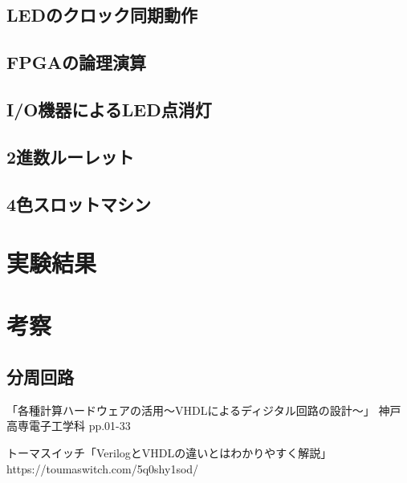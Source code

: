\documentclass{ltjsarticle}
\begin{document}
	\subsection{LEDのクロック同期動作}
	\subsection{FPGAの論理演算}
	\subsection{I/O機器によるLED点消灯}
	\subsection{2進数ルーレット}
	\subsection{4色スロットマシン}
\section{実験結果}
\section{考察}
	\subsection{分周回路}
\begin{thebibliography}{99}
「各種計算ハードウェアの活用～VHDLによるディジタル回路の設計～」
神戸高専電子工学科 pp.01-33

トーマスイッチ「VerilogとVHDLの違いとはわかりやすく解説」
https://toumaswitch.com/5q0shy1sod/
\end{thebibliography}
\end{document}
